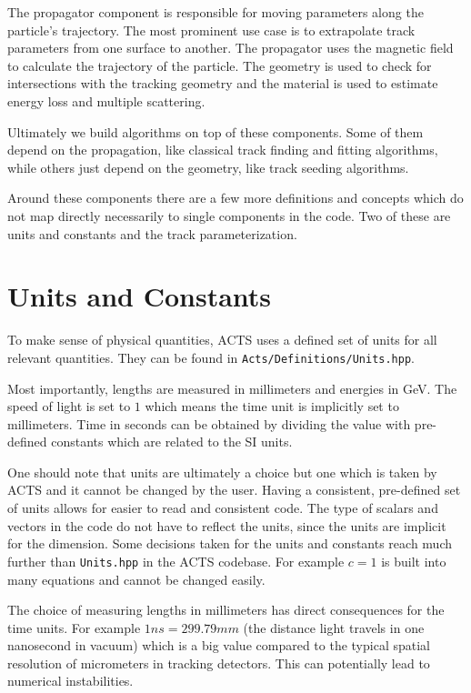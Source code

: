 The propagator component is responsible for moving parameters along the particle's trajectory. The most prominent use case is to extrapolate track parameters from one surface to another. The propagator uses the magnetic field to calculate the trajectory of the particle. The geometry is used to check for intersections with the tracking geometry and the material is used to estimate energy loss and multiple scattering.

Ultimately we build algorithms on top of these components. Some of them depend on the propagation, like classical track finding and fitting algorithms, while others just depend on the geometry, like track seeding algorithms.

Around these components there are a few more definitions and concepts which do not map directly necessarily to single components in the code. Two of these are units and constants and the track parameterization.

\section{Units and Constants}

To make sense of physical quantities, ACTS uses a defined set of units for all relevant quantities. They can be found in \texttt{Acts/Definitions/Units.hpp}.

Most importantly, lengths are measured in millimeters and energies in GeV. The speed of light is set to $1$ which means the time unit is implicitly set to millimeters. Time in seconds can be obtained by dividing the value with pre-defined constants which are related to the SI units.

One should note that units are ultimately a choice but one which is taken by ACTS and it cannot be changed by the user. Having a consistent, pre-defined set of units allows for easier to read and consistent code. The type of scalars and vectors in the code do not have to reflect the units, since the units are implicit for the dimension. Some decisions taken for the units and constants reach much further than \texttt{Units.hpp} in the ACTS codebase. For example $c = 1$ is built into many equations and cannot be changed easily.

The choice of measuring lengths in millimeters has direct consequences for the time units. For example $1 ns = 299.79 mm$ (the distance light travels in one nanosecond in vacuum) which is a big value compared to the typical spatial resolution of micrometers in tracking detectors. This can potentially lead to numerical instabilities.

